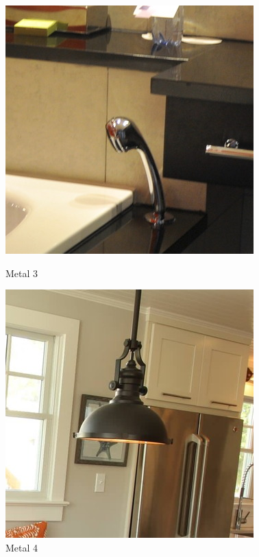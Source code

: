 \documentclass[conference, compsoc, 12pt]{IEEEtran}
\begin{document}
\begin{figure}[ht]
  \begin{minipage}[b]{0.5\linewidth}
    \centering
    \includegraphics[width=.8\linewidth]{metal_000015.jpg}
    \caption{Metal 3}
    \vspace{4ex}
  \end{minipage}%
  \begin{minipage}[b]{0.5\linewidth}
    \centering
    \includegraphics[width=.8\linewidth]{metal_000025.jpg}
    \caption{Metal 4}
    \vspace{4ex}
  \end{minipage}
\end{figure}
\end{document}
